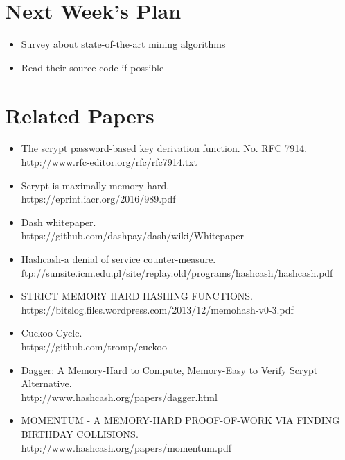 \documentclass[11pt]{article}
\begin{document}
%
%
\section{Next Week's Plan}
\begin{itemize}
\item Survey about state-of-the-art mining algorithms
\item Read their source code if possible
\end{itemize}

%
%
\section{Related Papers}
\begin{itemize}
\item The scrypt password-based key derivation function. No. RFC 7914. \\
http://www.rfc-editor.org/rfc/rfc7914.txt
\item Scrypt is maximally memory-hard. \\
https://eprint.iacr.org/2016/989.pdf 
\item Dash whitepaper. \\
https://github.com/dashpay/dash/wiki/Whitepaper
\item Hashcash-a denial of service counter-measure. \\
ftp://sunsite.icm.edu.pl/site/replay.old/programs/hashcash/hashcash.pdf
\item STRICT MEMORY HARD HASHING FUNCTIONS. \\
https://bitslog.files.wordpress.com/2013/12/memohash-v0-3.pdf
\item Cuckoo Cycle. \\
https://github.com/tromp/cuckoo
\item Dagger: A Memory-Hard to Compute, Memory-Easy to Verify Scrypt Alternative. \\
http://www.hashcash.org/papers/dagger.html
\item MOMENTUM - A MEMORY-HARD PROOF-OF-WORK VIA FINDING BIRTHDAY COLLISIONS. \\
http://www.hashcash.org/papers/momentum.pdf
\end{itemize}
\end{document}
